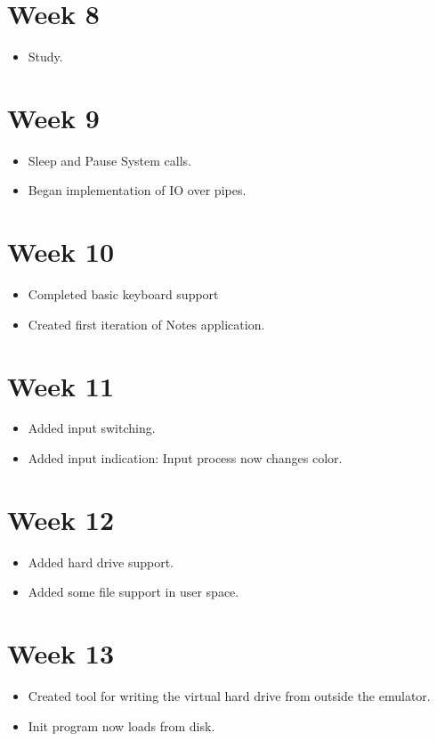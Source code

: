 \documentclass[a4paper]{report}
\begin{document}
\section*{Week 8}
\begin{itemize}
\item Study.
\end{itemize}

\section*{Week 9}
\begin{itemize}
\item Sleep and Pause System calls.
\item Began implementation of IO over pipes.
\end{itemize}

\section*{Week 10}
\begin{itemize}
\item Completed basic keyboard support
\item Created first iteration of Notes application.
\end{itemize}

\section*{Week 11}
\begin{itemize}
\item Added input switching.
\item Added input indication: Input process now changes color.
\end{itemize}

\section*{Week 12}
\begin{itemize}
\item Added hard drive support.
\item Added some file support in user space.

\end{itemize}

\section*{Week 13}
\begin{itemize}
\item Created tool for writing the virtual hard drive from outside the emulator.
\item Init program now loads from disk.
\end{itemize}
\end{document}
